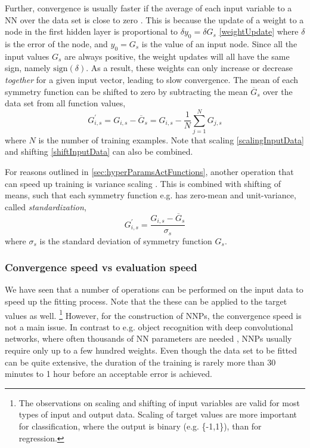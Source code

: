 \documentclass[twoside,english]{uiofysmaster}
\begin{document}
Further, convergence is usually faster if the average of each input variable to a NN over the 
data set is close to zero \cite{LeCun12}.
This is because the update of a weight to a node in the first hidden layer is proportional 
to $\delta y_0 = \delta G_s$ \eqref{weightUpdate} where $\delta$ is the error of the node,
and $y_0 = G_s$ is the value of an input node. 
Since all the input values $G_s$ are always positive, the weight updates will all have the same sign, namely $\mathrm{sign}(\delta)$. 
As a result, these weights can only increase or decrease \textit{together} for a given input vector, leading to slow convergence.
The mean of each symmetry function can be shifted to zero by subtracting the mean $\overline{G}_s$ over the data set from 
all function values,
\begin{equation}
 G_{i,s}^\prime = G_{i,s} - \overline{G}_s =  G_{i,s} - \frac{1}{N}\sum_{j=1}^N G_{j,s}
 \label{shiftInputData}
\end{equation}
where $N$ is the number of training examples. Note that scaling \eqref{scalingInputData} and shifting \eqref{shiftInputData}
can also be combined. 

For reasons outlined in \autoref{sec:hyperParamsActFunctions},
another operation that can speed up training is variance scaling \cite{LeCun12}.
This is combined with shifting of means, such that each symmetry function e.g. has zero-mean and unit-variance,
called \textit{standardization},
\begin{equation}
 G_{i,s}^\prime = \frac{G_{i,s} - \overline{G}_s}{\sigma_s} 
 \label{scaleVariance}
\end{equation}
where $\sigma_s$ is the standard deviation of symmetry function $G_s$. 

\subsubsection{Convergence speed vs evaluation speed}
We have seen that a number of operations can be performed on the input data to speed up the fitting process.  
Note that the these can be applied to the target values as well.  
\footnote{The observations on scaling and shifting of input variables are valid for most 
types of input and output data. Scaling of target values are more important 
for classification, where the output is binary (e.g. \{-1,1\}), than for regression.} However, for the construction of NNPs, 
the convergence speed is not a main issue. In contrast to e.g. object recognition with deep convolutional networks, where
often thousands of NN parameters are needed \cite{LeCun99}, NNPs usually require only up to a few hundred weights. Even though 
the data set to be fitted can be quite extensive, the duration of the training is rarely more than 30 minutes to 1 hour before 
an acceptable error is achieved.
\end{document}
